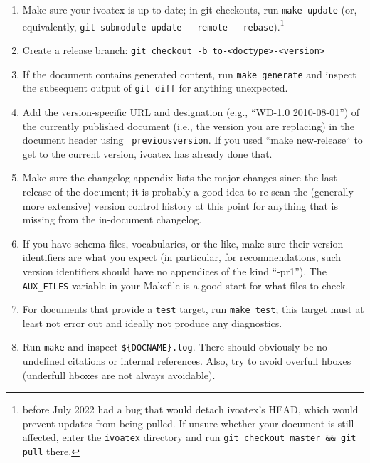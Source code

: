\documentclass[11pt,a4paper]{ivoa}
\newcommand{\texword}[1]{\texttt{\color{texcolor} #1}}
\begin{document}
\begin{enumerate}
\item Make sure your ivoatex is up to date; in git checkouts, run
\verb|make update| (or, equivalently,
\verb|git submodule update --remote --rebase|).\footnote{\ivoatex{} before
July 2022 had a bug that would detach ivoatex's HEAD, which would
prevent \ivoatex{} updates from being pulled.  If unsure whether your
document is still affected, enter the \texttt{ivoatex} directory and run
\texttt{git checkout master \&\& git pull} there.}

\item Create a release branch:
\verb|git checkout -b to-<doctype>-<version>|

\item If the document contains generated content, run
\verb|make generate|
and inspect the subsequent output of
\verb|git diff|
for anything unexpected.

\item Add the version-specific URL and designation (e.g.,
``WD-1.0 2010-08-01'') of the currently
published document (i.e., the version you are replacing) in the document
header using \texword{previousversion}.  If you used ``make
new-release`` to get to the current version, ivoatex has already done
that.

\item Make sure the changelog appendix lists the major changes since the
last release of the document; it is probably a good idea to re-scan the
(generally more extensive) version control history at this point for
anything that is missing from the in-document changelog.

\item If you have schema files, vocabularies, or the like, make sure
their version identifiers are what you expect (in particular, for
recommendations, such version identifiers should have no appendices
of the kind ``-pr1'').  The \verb|AUX_FILES| variable in your Makefile is
a good start for what files to check.

\item For documents that provide a \verb|test| target, run
\verb|make test|;
this target must at least not error out and ideally not produce
any diagnostics.

\item Run \verb|make| and inspect \verb|${DOCNAME}.log|.  There should
obviously be no undefined citations or internal references.  Also, try
to avoid overfull hboxes (underfull hboxes are not always avoidable).


\end{enumerate}
\end{document}
